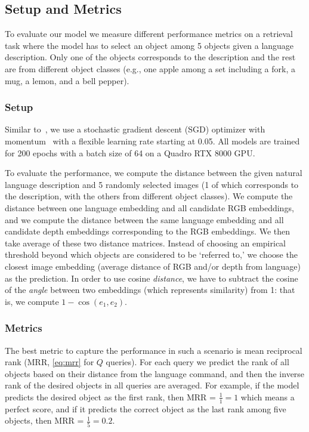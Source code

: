 \documentclass[10pt]{article} %
\begin{document}
\subsection{Setup and Metrics}
\label{sec:setupmetrics}
To evaluate our model we measure different performance metrics on a retrieval task where the model has to select an object among 5 objects given a language description. Only one of the objects corresponds to the description and the rest are from different object classes (e.g., one apple among a set including a fork, a mug, a lemon, and a bell pepper).


\subsubsection{Setup}
\label{sec:setup}
Similar to~\citet{NEURIPS2020_supervised_contrastive}, we use a stochastic gradient descent (SGD) optimizer with momentum~\cite{ruder2016overviewSGD} with a flexible learning rate starting at 0.05. 
All models are trained for 200 epochs with a batch size of 64 on a Quadro RTX 8000 GPU.


To evaluate the performance, we compute the distance between the given natural language description and 5 randomly selected images (1 of which corresponds to the description, with the others from different object classes). We compute the distance between one language embedding and all candidate RGB embeddings, and we compute the distance between the same language embedding and all candidate depth embeddings corresponding to the RGB embeddings. We then take average of these two distance matrices. Instead of choosing an empirical threshold beyond which objects are considered to be `referred to,' we choose the closest image embedding (average distance of RGB and/or depth from language) as the prediction.
In order to use cosine \textit{distance}, we have to subtract the cosine of the \textit{angle} between two embeddings (which represents similarity) from 1: that is, we compute $1 - \cos(e_1, e_2)$.

\subsubsection{Metrics}
\label{sec:metrics}
The best metric to capture the performance in such a scenario is mean reciprocal rank (MRR, \cref{eq:mrr} for $Q$ queries). For each query we predict the rank of all objects based on their distance from the language command, and then the inverse rank of the desired objects in all queries are averaged. For example, if the model predicts the desired object as the first rank, then MRR = $\frac{1}{1} = 1$ which means a perfect score, and if it predicts the correct object as the last rank among five objects, then MRR = $\frac{1}{5}=0.2$. 
\end{document}

